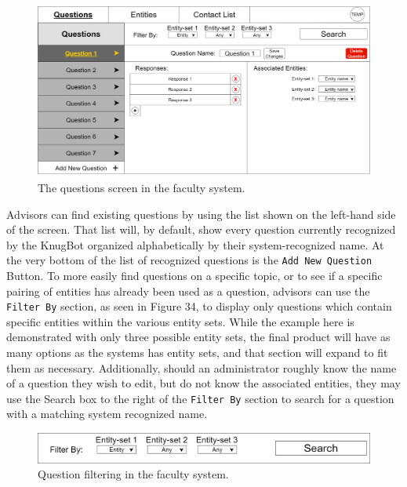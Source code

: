 \documentclass[titlepage, 12pt]{article}
\begin{document}
\begin{figure}[h]
    \centering\includegraphics[width=1\linewidth]{images/system-design/faculty-questions.png}
    \caption{The questions screen in the faculty system.}
\end{figure}

Advisors can find existing questions by using the list shown on the left-hand side of the screen. That list will, by default, show every question currently recognized by the KnugBot organized alphabetically by their system-recognized name. At the very bottom of the list of recognized questions is the \texttt{Add New Question} Button. To more easily find questions on a specific topic, or to see if a specific pairing of entities has already been used as a question, advisors can  use the \texttt{Filter By} section, as seen in Figure 34, to display only questions which contain specific entities within the various entity sets. While the example here is demonstrated with only three possible entity sets, the final product will have as many options as the systems has entity sets, and that section will expand to fit them as necessary. Additionally, should an administrator roughly know the name of a question they wish to edit, but do not know the associated entities, they may use the Search box to the right of the \texttt{Filter By} section to search for a question with a matching system recognized name.

\begin{figure}[h]
    \centering\includegraphics[width=1\linewidth]{images/system-design/faculty-questions-filters.png}
    \caption{Question filtering in the faculty system.}
\end{figure}
\end{document}

